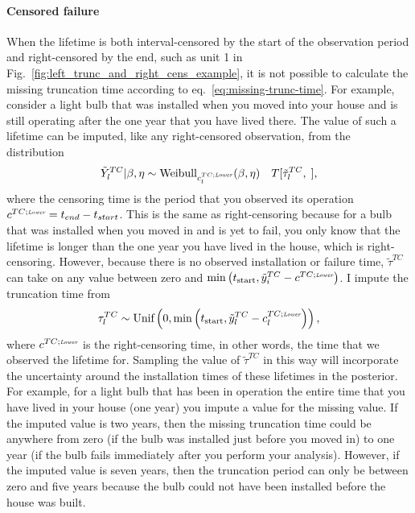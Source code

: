 \paragraph*{Censored failure}
When the lifetime is both interval-censored by the start of the observation period and right-censored by the end, such as unit 1 in Fig.~\ref{fig:left_trunc_and_right_cens_example}, it is not possible to calculate the missing truncation time according to eq.~\eqref{eq:missing-trunc-time}. For example, consider a light bulb that was installed when you moved into your house and is still operating after the one year that you have lived there. The value of such a lifetime can be imputed, like any right-censored observation, from the distribution
\begin{equation}
    \tilde{Y}^{TC}_l|\beta, \eta \sim \hbox{Weibull}_{c^{TC;\textit{\tiny{Lower}}}_{l}}(\beta, \eta) \quad T[\tilde{\tau}^{TC}_l, \;], 
\end{equation}
where the censoring time is the period that you observed its operation $c^{TC;\textit{\tiny{Lower}}} = t_{end} - t_{start}$. This is the same as right-censoring because for a bulb that was installed when you moved in and is yet to fail, you only know that the lifetime is longer than the one year you have lived in the house, which is right-censoring. However, because there is no observed installation or failure time, $\tilde{\tau}^{TC}$ can take on any value between zero and $\min\left(t_\text{start}, \tilde{y}^{TC}_i - c^{TC;\textit{\tiny{Lower}}}\right)$. I impute the truncation time from
\begin{equation}
    \label{eq:imp-trun-times}
    \tau^{TC}_l \sim \hbox{Unif}\left(0, \min\left(t_\text{start}, \tilde{y}^{TC}_l - c^{TC;\textit{\tiny{Lower}}}_l\right)\right),
\end{equation}
where $c^{TC;\textit{\tiny{Lower}}}$ is the right-censoring time, in other words, the time that we observed the lifetime for. Sampling the value of $\tilde{\tau}^{TC}$ in this way will incorporate the uncertainty around the installation times of these lifetimes in the posterior. For example, for a light bulb that has been in operation the entire time that you have lived in your house (one year) you impute a value for the missing value. If the imputed value is two years, then the missing truncation time could be anywhere from zero (if the bulb was installed just before you moved in) to one year (if the bulb fails immediately after you perform your analysis). However, if the imputed value is seven years, then the truncation period can only be between zero and five years because the bulb could not have been installed before the house was built.

